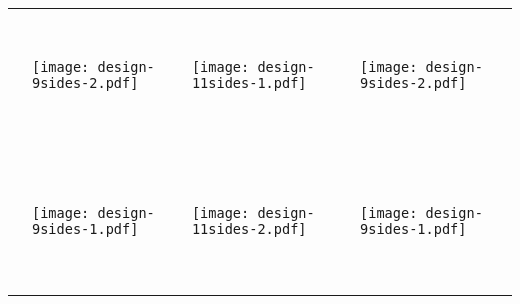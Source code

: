 \documentclass{article}
\begin{document}
\begin{table}

\begin{tabular}{|p{1em}|l|p{1em}|l|p{1em}|l|p{1em}|}
  
\hline
\hline
&&&&&& \tabularnewline
&&&&&& \tabularnewline
&&&&&& \tabularnewline
&&&&&& \tabularnewline
&&&&&& \tabularnewline
&&&&&& \tabularnewline
&&&&&& \tabularnewline
&&&&&& \tabularnewline
&
\texttt{[image: design-9sides-2.pdf]} 
& &
\texttt{[image: design-11sides-1.pdf]} 
& &
\texttt{[image: design-9sides-2.pdf]} 
&
\tabularnewline
&&&&&& \tabularnewline
&&&&&& \tabularnewline
&&&&&& \tabularnewline
&&&&&& \tabularnewline
&&&&&& \tabularnewline
&&&&&& \tabularnewline
&&&&&& \tabularnewline
&&&&&& \tabularnewline
\hline
\tabularnewline
\tabularnewline
\hline
&&&&&& \tabularnewline
&&&&&& \tabularnewline
&&&&&& \tabularnewline
&&&&&& \tabularnewline
&&&&&& \tabularnewline
&&&&&& \tabularnewline
&&&&&& \tabularnewline
&&&&&& \tabularnewline
&
\texttt{[image: design-9sides-1.pdf]} 
& & 
\texttt{[image: design-11sides-2.pdf]} 
& &
\texttt{[image: design-9sides-1.pdf]} 
&
\tabularnewline
&&&&&& \tabularnewline
&&&&&& \tabularnewline
&&&&&& \tabularnewline
&&&&&& \tabularnewline
&&&&&& \tabularnewline
&&&&&& \tabularnewline
&&&&&& \tabularnewline
&&&&&& \tabularnewline
&&&&&& \tabularnewline
\hline
\hline
\end{tabular}
\end{table}
\end{document}

